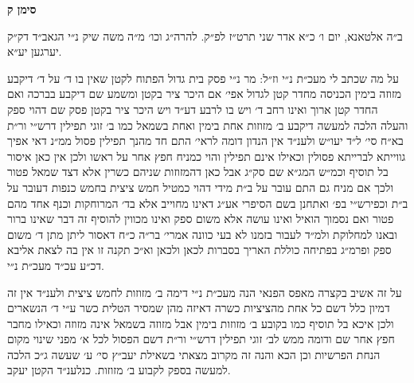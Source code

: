 \documentclass[12pt, openany]{book}
\newcommand{\chapname}{}
\newcommand{\newchap}[1]{
	\addcontentsline{toc}{chapter}{#1}
	\renewcommand{\chapname}{#1}
		\begin{center}
			\textbf{%
\fontsize{16pt}{16pt}\selectfont
				#1}
		\end{center}
}
\begin{document}
\newchap{סימן ק}
\begin{multicols}{2}
ב״ה אלטאנא, יום ו׳ כ״א אדר שני תרט״ז לפ״ק. להרה״ג וכו׳ מ״ה משה שיק נ״י הגאב״ד דק״ק יערגען יע״א.\\\vspace{0pt}

על מה שכתב לי מעכ״ת נ״י וז״ל: מר נ״י פסק בית גדול הפתוח לקטן שאין בו ד׳ על ד׳ דיקבע מזוזה בימין הכניסה מחדר קטן לגדול אפי׳ אם היכר ציר בקטן ומשמע שם דיקבע בברכה ואם החדר קטן ארוך ואינו רחב ד׳ ויש בו לרבע דע״ד ויש היכר ציר בקטן פסק שם דהוי ספק והעלה הלכה למעשה דיקבע ב׳ מזוזות אחת בימין ואחת בשמאל כמו ב׳ זוגי תפילין דרש״י ור״ת בא״ח סי׳ ל״ד יעו״ש ולענ״ד אין הנדון דומה לראי׳ התם חד מהנך תפילין פסול ממ״נ דאי אפיך גווייתא לברייתא פסולין וכאילו אינם תפילין והוי כמניח חפץ אחר על ראשו ולכן אין כאן איסור בל תוסיף וכמ״ש המג״א שם סק״ג אבל כאן דהמזוזות שניהם כשרין אלא דצד שמאל פטור ולכך אם מניח גם התם עובר על ב״ת מידי דהוי כמטיל חמש ציצית בחמש כנפות דעובר על ב״ת וכפירש״י בפ׳ ואתחנן בשם הסיפרי אע״ג דאינו מחוייב אלא בד׳ המרוחקות וכנף אחד מהם פטור ואם נסמוך הואיל ואינו עושה אלא משום ספק ואינו מכווין להוסיף זה דבר שאינו ברור ובאנו למחלוקת ולמ״ד לעבור בזמנו לא בעי כוונה אמרי׳ בר״ה כ״ח דאסור ליתן מתן ד׳ משום ספק ופרמ״ג בפתיחה כוללת האריך בסברות לכאן ולכאן וא״כ תקנה זו אין בה לצאת אליבא דכ״ע עכ״ד מעכ״ת נ״י.\\\vspace{0pt}

על זה אשיב בקצרה מאפס הפנאי הנה מעכ״ת נ״י דימה ב׳ מזוזות לחמש ציצית ולענ״ד אין זה דמיון כלל דשם כל אחת מהציציות כשרה דאיזה מהן שמסיר הטלית כשר ע״י ד׳ הנשארים ולכן איכא בל תוסיף כמו בקובע ב׳ מזוזות בימין אבל מזוזה בשמאל אינה מזוזה וכאילו מחבר חפץ אחר שם ודומה ממש לב׳ זוגי תפילין דרש״י ור״ת דשם הפסול לכל א׳ מפני שינוי מקום הנחת הפרשיות וכן הכא והנה זה מקרוב מצאתי בשאילת יעב״ץ סי׳ ע׳ שעשה ג״כ הלכה למעשה בספק לקבוע ב׳ מזוזות. כנלענ״ד הקטן יעקב.\\\vspace{0pt}

\end{multicols}\newpage
\end{document}
